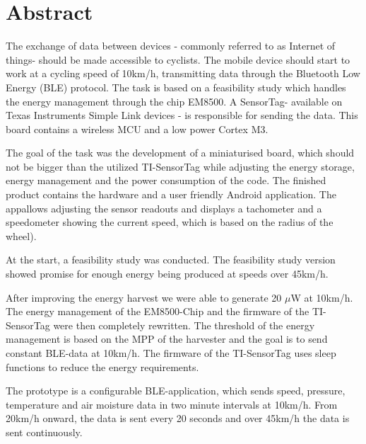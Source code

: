 \chapter{Abstract}

The exchange of data between devices - commonly referred to as
\glqq Internet of things\grqq - should be made accessible to cyclists. The
mobile device should start to work at a cycling speed of 10km/h,
transmitting data through the Bluetooth Low Energy (BLE) protocol. The
task is based on a feasibility study which handles the energy
management through the chip EM8500. A \glqq SensorTag\grqq - available on Texas
Instruments Simple Link devices - is responsible for sending the data.
This board contains a wireless MCU and a low power Cortex M3.

The goal of the task was the development of a miniaturised board, which
should not be bigger than the utilized TI-SensorTag while adjusting the
energy storage, energy management and the power consumption of the
code. The finished product contains the hardware and a user friendly
Android application. The \glqq app\grqq allows adjusting the sensor readouts and
displays a tachometer and a speedometer showing the current speed, which is based on the radius of the wheel).

At the start, a feasibility study was conducted. The feasibility study
version showed promise for enough energy being produced at speeds
over 45km/h.

After improving the energy harvest we were able to generate 20
$\mu$W at 10km/h. The energy management of the EM8500-Chip and the
firmware of the TI-SensorTag were then completely rewritten. The
threshold of the energy management is based on the MPP of the harvester
and the goal is to send constant BLE-data at 10km/h. The firmware of
the TI-SensorTag uses sleep functions to reduce the energy
requirements.

The prototype is a configurable BLE-application, which sends speed,
pressure, temperature and air moisture data in two minute intervals at
10km/h. From 20km/h onward, the data is sent every 20 seconds and over
45km/h the data is sent continuously.
